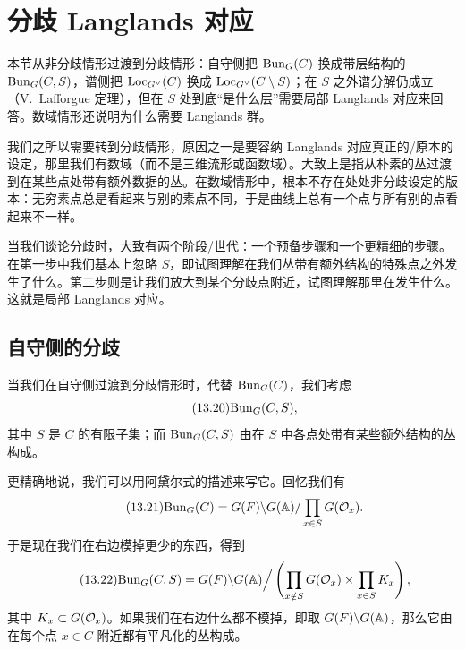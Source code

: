 \section{分歧 Langlands 对应}\label{sec:13-3}

\begin{sectionkey}
本节从非分歧情形过渡到分歧情形：自守侧把 $\mathrm{Bun}_G(C)$ 换成带层结构的 $\mathrm{Bun}_G(C,S)$，谱侧把 $\mathrm{Loc}_{G^\vee}(C)$ 换成 $\mathrm{Loc}_{G^\vee}(C\setminus S)$；在 $S$ 之外谱分解仍成立（V.~Lafforgue 定理），但在 $S$ 处到底“是什么层”需要局部 Langlands 对应来回答。数域情形还说明为什么需要 Langlands 群。
\end{sectionkey}

我们之所以需要转到分歧情形，原因之一是要容纳 Langlands 对应真正的/原本的设定，那里我们有数域（而不是三维流形或函数域）。大致上是指从朴素的丛过渡到在某些点处带有额外数据的丛。在数域情形中，根本不存在处处非分歧设定的版本：无穷素点总是看起来与别的素点不同，于是曲线上总有一个点与所有别的点看起来不一样。

当我们谈论分歧时，大致有两个阶段/世代：一个预备步骤和一个更精细的步骤。在第一步中我们基本上忽略 $S$，即试图理解在我们丛带有额外结构的特殊点之外发生了什么。第二步则是让我们放大到某个分歧点附近，试图理解那里在发生什么。这就是局部 Langlands 对应。

\subsection{自守侧的分歧}\label{sec:13-3-1}

当我们在自守侧过渡到分歧情形时，代替 $\mathrm{Bun}_G(C)$，我们考虑
\begin{equation}\tag{13.20}
\mathrm{Bun}_G(C,S),
\end{equation}
其中 $S$ 是 $C$ 的有限子集；而 $\mathrm{Bun}_G(C,S)$ 由在 $S$ 中各点处带有某些额外结构的丛构成。

更精确地说，我们可以用阿黛尔式的描述来写它。回忆我们有
\begin{equation}\tag{13.21}
\mathrm{Bun}_G(C)=G(F)\backslash G(\mathbb{A})/\prod_{x\in S}G(\mathcal{O}_x).
\end{equation}
于是现在我们在右边模掉更少的东西，得到
\begin{equation}\tag{13.22}
\mathrm{Bun}_G(C,S)=G(F)\backslash G(\mathbb{A})\Big/\left(\prod_{x\notin S}G(\mathcal{O}_x)\times\prod_{x\in S}K_x\right),
\end{equation}
其中 $K_x\subset G(\mathcal{O}_x)$。如果我们在右边什么都不模掉，即取 $G(F)\backslash G(\mathbb{A})$，那么它由在每个点 $x\in C$ 附近都有平凡化的丛构成。

